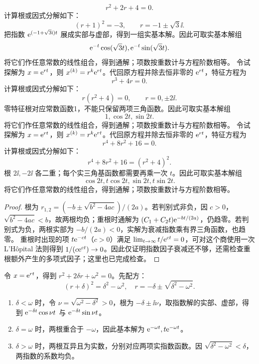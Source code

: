 \[
r^2+2r+4=0.
\]
计算根或因式分解如下：
\[
(r+1)^2=-3,\qquad r=-1\pm\sqrt3\ii.
\]
把指数 $\mathrm e^{(-1+\sqrt3\mathrm i)t}$ 展成实部与虚部，得到一组实基本解。因此可取实基本解组
\[
\mathrm e^{-t}\cos(\sqrt3t),\mathrm e^{-t}\sin(\sqrt3t).
\]
将它们作任意常数的线性组合，得到通解；项数按重数计与方程阶数相等。
令试探解为 $x=\mathrm e^{rt}$，则 $x^{(k)}=r^k\mathrm e^{rt}$。代回原方程并除去恒非零的 $\mathrm e^{rt}$，特征方程为
\[
r^3+4r=0.
\]
计算根或因式分解如下：
\[
r(r^2+4)=0,\qquad r=0,\pm2\ii.
\]
零特征根对应常数函数1，不能只保留两项三角函数。因此可取实基本解组
\[
1,\cos2t,\sin2t.
\]
将它们作任意常数的线性组合，得到通解；项数按重数计与方程阶数相等。
令试探解为 $x=\mathrm e^{rt}$，则 $x^{(k)}=r^k\mathrm e^{rt}$。代回原方程并除去恒非零的 $\mathrm e^{rt}$，特征方程为
\[
r^4+8r^2+16=0.
\]
计算根或因式分解如下：
\[
r^4+8r^2+16=(r^2+4)^2.
\]
根 $2\ii,-2\ii$ 各二重；每个实三角基函数都需要再乘一次 $t$。因此可取实基本解组
\[
\cos2t,t\cos2t,\sin2t,t\sin2t.
\]
将它们作任意常数的线性组合，得到通解；项数按重数计与方程阶数相等。
\begin{proof}
根为 $r_{1,2}=(-b\pm\sqrt{b^2-4ac})/(2a)$。若判别式非负，因 $c>0$，$\sqrt{b^2-4ac}<b$，故两根均负；重根时通解为 $(C_1+C_2t)\mathrm e^{-bt/(2a)}$，仍趋零。若判别式为负，两根实部为 $-b/(2a)<0$，实解为衰减指数乘有界三角函数，也趋零。
重根时出现的项 $t\mathrm e^{-ct}$（$c>0$）满足 $\lim_{t\to\infty}t/\mathrm e^{ct}=0$，可对这个商使用一次 L'Hôpital 法则得到 $1/(c\mathrm e^{ct})\to0$。因此仅证明指数因子衰减还不够，还需检查重根额外产生的多项式因子；这里也已完成检查。
\end{proof}
令 $x=\mathrm e^{rt}$，得到 $r^2+2\delta r+\omega^2=0$。先配方：
\[
(r+\delta)^2=\delta^2-\omega^2,
\quad r=-\delta\pm\sqrt{\delta^2-\omega^2}.
\]
\begin{enumerate}
\item $\delta<\omega$ 时，令 $\nu=\sqrt{\omega^2-\delta^2}>0$，根为 $-\delta\pm\ii\nu$，取指数解的实部、虚部，得到 $\mathrm e^{-\delta t}\cos\nu t$ 与 $\mathrm e^{-\delta t}\sin\nu t$。
\item $\delta=\omega$ 时，两根重合于 $-\omega$，因此基本解为 $\mathrm e^{-\omega t},t\mathrm e^{-\omega t}$。
\item $\delta>\omega$ 时，两根互异且为实数，分别对应两项实指数函数。因 $\sqrt{\delta^2-\omega^2}<\delta$，两指数的系数均负。
\end{enumerate}
